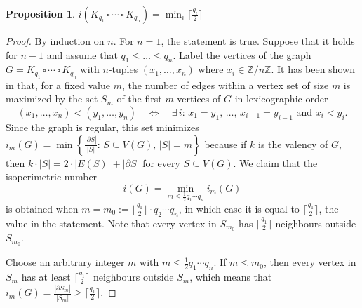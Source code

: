\documentclass[a4paper,11pt]{article}
\newtheorem{proposition}[theorem]{Proposition}
\theoremstyle{definition}
\newcommand{\cartesianproduct}{\,\square\,}
\begin{document}
\begin{proposition}\label{prop:Hamming}
    \(i(K_{q_1}\cartesianproduct\cdots\cartesianproduct K_{q_n})=\min_i\lceil\frac{q_i}2\rceil\)
\end{proposition}

\begin{proof}
    By induction on \(n\). For \(n=1\), the statement is true. Suppose that it holds for \(n-1\) and assume that \(q_1\leq\dots\leq q_n\). Label the vertices of the graph \(G=K_{q_1}\cartesianproduct\cdots\cartesianproduct K_{q_n}\) with \(n\)-tuples \((x_1,\dots,x_n)\) where \(x_i\in\mathbb{Z}/n\mathbb{Z}\).
    It has been shown in \cite{Lindsey} that, for a fixed value \(m\), the number of edges within a vertex set of size \(m\) is maximized by the set \(S_m\) of the first \(m\) vertices of \(G\) in lexicographic order
    \[(x_1,\dots,x_n)<(y_1,\dots,y_n)\quad\Longleftrightarrow\quad\exists\,i\colon\,x_1=y_1,\,\dots,\,x_{i-1}=y_{i-1}\text{ and }x_i<y_i.\]
    Since the graph is regular, this set minimizes \(i_m(G)=\min \left\{\frac{|\partial S|}{|S|} \colon\, S \subseteq V(G),\, |S|=m\right\}\) because if \(k\) is the valency of \(G\), then \(k\cdot|S|=2\cdot|E(S)|+|\partial S|\) for every \(S\subseteq V(G)\).
    We claim that the isoperimetric number $$i(G)=\min_{m\leq\frac12q_1\cdots q_n} i_m(G)$$ is obtained when \(m=m_0:=\lfloor\frac{q_1}2\rfloor\cdot q_2\cdots q_n\), in which case it is equal to \(\lceil\frac{q_1}2\rceil\), the value in the statement. Note that every vertex in \(S_{m_0}\) has \(\lceil\frac{q_1}2\rceil\) neighbours outside \(S_{m_0}\).

    Choose an arbitrary integer \(m\) with \(m\leq\frac12q_1\cdots q_n\). If \(m\leq m_0\), then every vertex in \(S_m\) has at least \(\lceil\frac{q_1}2\rceil\) neighbours outside \(S_m\), which means that \(i_m(G)=\frac{|\partial S_m|}{|S_m|}\geq\lceil\frac{q_1}2\rceil\).
   

\end{proof}
\end{document}
